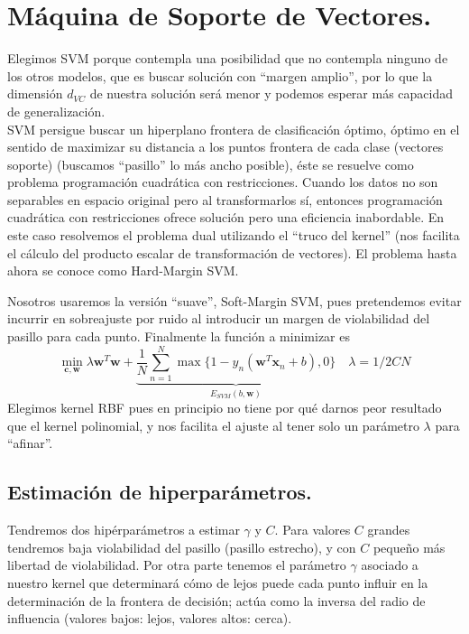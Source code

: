 \documentclass[11pt,a4paper]{article}
\theoremstyle{definition}
\begin{document}
	\section{Máquina de Soporte de Vectores.}
	Elegimos SVM porque contempla una posibilidad que no contempla ninguno de los otros modelos, que es buscar solución con ``margen amplio'', por lo que la dimensión $d_{VC}$ de nuestra solución será menor y podemos esperar más capacidad de generalización.\\ SVM persigue buscar un hiperplano frontera de clasificación óptimo, óptimo en el sentido de maximizar su distancia a los puntos frontera de cada clase (vectores soporte) (buscamos ``pasillo'' lo más ancho posible), éste se resuelve como problema programación cuadrática con  restricciones. Cuando los datos no son separables en espacio original pero al transformarlos sí, entonces programación cuadrática con restricciones ofrece solución pero una eficiencia inabordable. En este caso resolvemos el problema dual utilizando el ``truco del kernel'' (nos facilita el cálculo del producto escalar de transformación de vectores). El problema hasta ahora se conoce como Hard-Margin SVM.
	
	Nosotros usaremos la versión ``suave'', Soft-Margin SVM, pues pretendemos evitar incurrir en sobreajuste por ruido al introducir un margen de violabilidad del pasillo para cada punto. 
	Finalmente la función a minimizar es
	$$ \min_{\mathbf{c},\mathbf{w}} \lambda \mathbf{w}^T\mathbf{w} + \underbrace{\frac{1}{N}\sum_{n=1}^N \max\{1-y_n(\mathbf{w}^T\mathbf{x}_n+b),0\}}_{E_{SVM}(b,\mathbf{w})} \quad \lambda=1/2CN$$
	Elegimos kernel RBF pues en principio no tiene por qué darnos peor resultado que el kernel polinomial, y nos facilita el ajuste al tener solo un parámetro $\lambda$ para ``afinar''.
	
	
	\subsection{Estimación de hiperparámetros.}
	Tendremos dos hipérparámetros a estimar $\gamma$ y $C$.	Para valores $C$ grandes tendremos baja violabilidad del pasillo (pasillo estrecho), y con $C$ pequeño más libertad de violabilidad. Por otra parte tenemos el parámetro $\gamma$ asociado a nuestro kernel que determinará cómo de lejos puede cada punto influir en la determinación de la frontera de decisión; actúa como la inversa del radio de influencia (valores bajos: lejos, valores altos: cerca).
	
\end{document}
